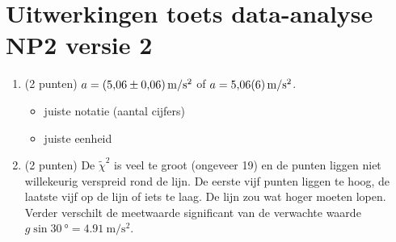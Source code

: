 \documentclass[a4paper,11pt]{article}
\begin{document}
\section*{Uitwerkingen toets data-analyse NP2 versie 2}

\begin{enumerate}
  \item (2 punten) $a = \SI[separate-uncertainty=true]{5,06 +- 0,06}{\meter\per\second\squared}$ of $a = \SI[separate-uncertainty=false]{5,06 +- 0,06}{\meter\per\second\squared}$.
  \begin{itemize}
    \item juiste notatie (aantal cijfers)
    \item juiste eenheid
  \end{itemize}
  \item (2 punten) De $\tilde\chi^2$ is veel te groot (ongeveer 19) en de punten liggen niet willekeurig verspreid rond de lijn. De eerste vijf punten liggen te hoog, de laatste vijf op de lijn of iets te laag. De lijn zou wat hoger moeten lopen. Verder verschilt de meetwaarde significant van de verwachte waarde $g\sin \SI{30}{\degree} = \SI{4,91}{\meter\per\second\squared}$.


\end{enumerate}
\end{document}
